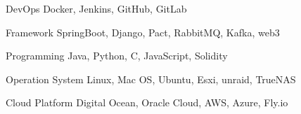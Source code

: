 
\begin{cvskills}
  \cvskill
    {DevOps} %
    {Docker, Jenkins, GitHub, GitLab} %

  \cvskill
    {Framework} %
    {SpringBoot, Django, Pact, RabbitMQ, Kafka, web3} %

  \cvskill
    {Programming} %
    {Java, Python, C, JavaScript, Solidity} %

  \cvskill
    {Operation System} %
    {Linux, Mac OS, Ubuntu, Esxi, unraid, TrueNAS} %

  \cvskill
    {Cloud Platform} %
    {Digital Ocean, Oracle Cloud, AWS, Azure, Fly.io} %

\end{cvskills}
